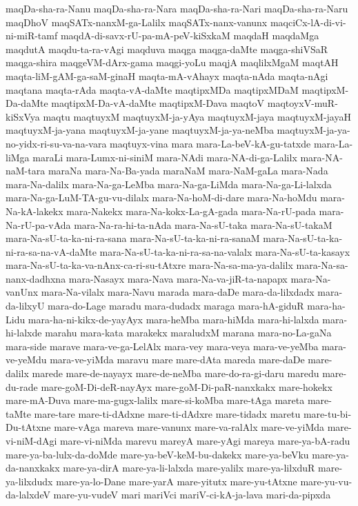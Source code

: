 {maqDa-sha-ra-Nanu
maqDa-sha-ra-Nara
maqDa-sha-ra-Nari
maqDa-sha-ra-Naru
maqDhoV
maqSATx-nanxM-ga-Lalilx
maqSATx-nanx-vanunx
maqciCx-lA-di-vi-ni-miR-tamf
maqdA-di-savx-rU-pa-mA-peV-kiSxkaM
maqdaH
maqdaMga
maqdutA
maqdu-ta-ra-vAgi
maqduva
maqga
maqga-daMte
maqga-shiVSaR
maqga-shira
maqgeVM-dArx-gama
maqgi-yoLu
maqjA
maqlilxMgaM
maqtAH
maqta-liM-gAM-ga-saM-ginaH
maqta-mA-vAhayx
maqta-nAda
maqta-nAgi
maqtana
maqta-rAda
maqta-vA-daMte
maqtipxMDa
maqtipxMDaM
maqtipxM-Da-daMte
maqtipxM-Da-vA-daMte
maqtipxM-Dava
maqtoV
maqtoyxV-muR-kiSxVya
maqtu
maqtuyxM
maqtuyxM-ja-yAya
maqtuyxM-jaya
maqtuyxM-jayaH
maqtuyxM-ja-yana
maqtuyxM-ja-yane
maqtuyxM-ja-ya-neMba
maqtuyxM-ja-ya-no-yidx-ri-su-va-na-vara
maqtuyx-vina
mara
mara-La-beV-kA-gu-tatxde
mara-La-liMga
maraLi
mara-Lumx-ni-siniM
mara-NAdi
mara-NA-di-ga-Lalilx
mara-NA-naM-tara
maraNa
mara-Na-Ba-yada
maraNaM
mara-NaM-gaLa
mara-Nada
mara-Na-dalilx
mara-Na-ga-LeMba
mara-Na-ga-LiMda
mara-Na-ga-Li-lalxda
mara-Na-ga-LuM-TA-gu-vu-dilalx
mara-Na-hoM-di-dare
mara-Na-hoMdu
mara-Na-kA-lakekx
mara-Nakekx
mara-Na-kokx-La-gA-gada
mara-Na-rU-pada
mara-Na-rU-pa-vAda
mara-Na-ra-hi-ta-nAda
mara-Na-sU-taka
mara-Na-sU-takaM
mara-Na-sU-ta-ka-ni-ra-sana
mara-Na-sU-ta-ka-ni-ra-sanaM
mara-Na-sU-ta-ka-ni-ra-sa-na-vA-daMte
mara-Na-sU-ta-ka-ni-ra-sa-na-valalx
mara-Na-sU-ta-kasayx
mara-Na-sU-ta-ka-va-nAnx-ca-ri-su-tAtxre
mara-Na-sa-ma-ya-dalilx
mara-Na-sa-nanx-dadhxna
mara-Nasayx
mara-Nava
mara-Na-va-jiR-ta-napapx
mara-Na-vanUnx
mara-Na-vilalx
mara-Navu
marada
mara-daDe
mara-da-lilxdadx
mara-da-lilxyU
mara-do-Lage
maradu
mara-dudadx
maraga
mara-hA-giduR
mara-ha-Lidu
mara-ha-ni-kikx-de-yayAyx
mara-heMba
mara-hiMda
mara-hi-lalxda
mara-hi-lalxde
marahu
mara-kata
marakekx
maraludxM
marana
mara-no-La-gaNa
mara-side
marave
mara-ve-ga-LelAlx
mara-vey
mara-veya
mara-ve-yeMba
mara-ve-yeMdu
mara-ve-yiMda
maravu
mare
mare-dAta
mareda
mare-daDe
mare-dalilx
marede
mare-de-nayayx
mare-de-neMba
mare-do-ra-gi-daru
maredu
mare-du-rade
mare-goM-Di-deR-nayAyx
mare-goM-Di-paR-nanxkakx
mare-hokekx
mare-mA-Duva
mare-ma-gugx-lalilx
mare-si-koMba
mare-tAga
mareta
mare-taMte
mare-tare
mare-ti-dAdxne
mare-ti-dAdxre
mare-tidadx
maretu
mare-tu-bi-Du-tAtxne
mare-vAga
mareva
mare-vanunx
mare-va-ralAlx
mare-ve-yiMda
mare-vi-niM-dAgi
mare-vi-niMda
marevu
mareyA
mare-yAgi
mareya
mare-ya-bA-radu
mare-ya-ba-lulx-da-doMde
mare-ya-beV-keM-bu-dakekx
mare-ya-beVku
mare-ya-da-nanxkakx
mare-ya-dirA
mare-ya-li-lalxda
mare-yalilx
mare-ya-lilxduR
mare-ya-lilxdudx
mare-ya-lo-Dane
mare-yarA
mare-yitutx
mare-yu-tAtxne
mare-yu-vu-da-lalxdeV
mare-yu-vudeV
mari
mariVci
mariV-ci-kA-ja-lava
mari-da-pipxda
}
